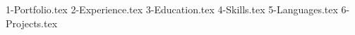 \documentclass[margin]{res}
\let\orighref\href
\renewcommand{\href}[2]{\orighref{#1}{#2\,\faExternalLink}}
\begin{document}
    \address{\\ E-MAIL \ : \href{mailto:louiszhenyean@gmail.com}{louiszhenyean@gmail.com}}
    \address{\\ LOCATION \ : Ipoh, Malaysia \\ \\}
    \begin{resume}\vspace{0.2cm}
        {1-Portfolio.tex}
        {2-Experience.tex}
        {3-Education.tex} \clearpage
        {4-Skills.tex} 
        {5-Languages.tex} 
        {6-Projects.tex} 
    \end{resume}
\textheight=700pt
\(\)
\end{document}
